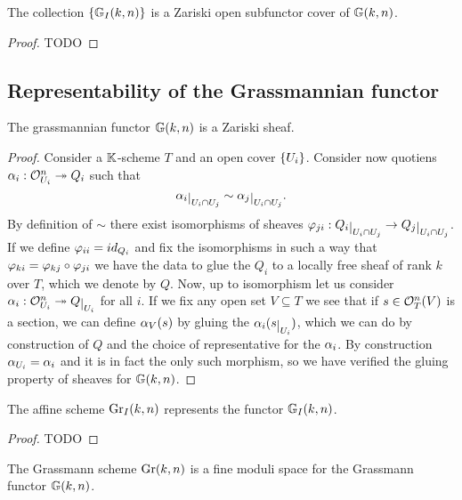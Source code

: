 \begin{proposition}\label{GrIAreOpenCover}
The collection $\left\{{\mathbb{G}_I(k,n)}\right\}$ is a Zariski open subfunctor cover of $\mathbb{G}(k,n)$.
\end{proposition}
\begin{proof}
TODO
\end{proof}


\subsection{Representability of the Grassmannian functor}
\begin{proposition}
The grassmannian functor $\mathbb{G}(k,n)$ is a Zariski sheaf.
\end{proposition}
\begin{proof}
Consider a $\mathbb{K}$-scheme $T$ and an open cover $\left\{{U_i}\right\}$. Consider now quotiens $\alpha_i:\mathcal{O}_{U_i}^n\twoheadrightarrow Q_i$ such that 
\[\al_i\res{U_i\cap U_j}\sim \al_j\res{U_i\cap U_j}.\]	
By definition of $\sim$ there exist isomorphisms of sheaves $\vp_{ji}:Q_i\res{U_{i}\cap U_j}\to Q_j\res{U_i\cap U_j}$. If we define $\varphi_{ii}=id_{Q_i}$ and fix the isomorphisms in such a way that $\varphi_{ki}=\varphi_{kj}\circ \varphi_{ji}$ we have the data to glue the $Q_i$ to a locally free sheaf of rank $k$ over $T$, which we denote by $Q$. Now, up to isomorphism let us consider $\al_i:\Oc_{U_i}^n\onto Q\res{U_i}$ for all $i$. If we fix any open set $V\subseteq T$ we see that if $s\in \mathcal{O}_T^n(V)$ is a section, we can define $\alpha_V(s)$ by gluing the $\al_i(s\res{U_i})$, which we can do by construction of $Q$ and the choice of representative for the $\alpha_i$. By construction $\alpha_{U_i}=\alpha_i$ and it is in fact the only such morphism, so we have verified the gluing property of sheaves for $\mathbb{G}(k,n)$.
\end{proof}

\begin{proposition}\label{GrIRepresentGrIFunctors}
The affine scheme $\mathrm{Gr}_I(k,n)$ represents the functor $\mathbb{G}_I(k,n)$.
\end{proposition}
\begin{proof}
TODO
\end{proof}

\begin{theorem}\label{GrassmannianIsModuliSpace}
The Grassmann scheme $\mathrm{Gr}(k,n)$ is a fine moduli space for the Grassmann functor $\mathbb{G}(k,n)$.
\end{theorem}